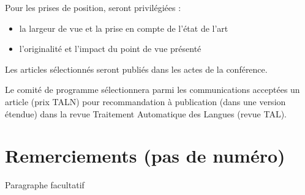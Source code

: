\documentclass[10pt,a4paper,twoside]{article}
\begin{document}
Pour les prises de position, seront privilégiées :
\begin{itemize}
 \item   la largeur de vue et la prise en compte de l’état de l’art
 \item   l’originalité et l’impact du point de vue présenté
\end{itemize}

Les articles sélectionnés seront publiés dans les actes de la conférence.

Le comité de programme sélectionnera parmi les communications acceptées un article (prix TALN) pour recommandation à publication (dans une version étendue) dans la revue Traitement Automatique des Langues (revue
TAL).


\section*{Remerciements (pas de numéro)}

Paragraphe facultatif



\nocite{TALN2015,LaigneletRioult09,LanglaisPatry07,SeretanWehrli07}

\end{document}
